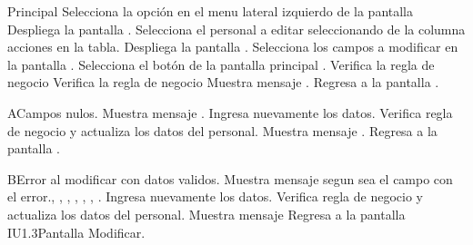 	\begin{UCtrayectoria}{Principal}
		\UCpaso[\UCactor]Selecciona la opción  en el menu lateral izquierdo de la pantalla 
		\UCpaso[\UCsist] Despliega la pantalla .	
		\UCpaso[\UCactor] Selecciona el personal a editar seleccionando   de la columna acciones en la tabla. 
		\UCpaso[\UCsist] Despliega la pantalla .
		\UCpaso[\UCactor] Selecciona los campos a modificar en la pantalla .
		\UCpaso[\UCactor] Selecciona el botón  de la pantalla principal .
		\UCpaso[\UCsist] Verifica la regla de negocio   
		\UCpaso[\UCsist] Verifica la regla de negocio  
		\UCpaso[\UCsist] Muestra mensaje .
		\UCpaso[\UCsist] Regresa a la pantalla .
	\end{UCtrayectoria}
		\begin{UCtrayectoriaA}{A}{Campos nulos.}
		\UCpaso[\UCsist] Muestra mensaje .
		\UCpaso[\UCactor] Ingresa nuevamente los datos.
		\UCpaso[\UCsist] Verifica regla de negocio  y actualiza los datos del personal. 
		\UCpaso[\UCsist] Muestra mensaje .
		\UCpaso[\UCsist] Regresa a la pantalla .
		\end{UCtrayectoriaA}

		\begin{UCtrayectoriaA}{B}{Error al modificar con datos validos.}
		\UCpaso[\UCsist] Muestra mensaje segun sea el campo con el error., , , , , , .
		\UCpaso[\UCactor] Ingresa nuevamente los datos.
		\UCpaso[\UCsist] Verifica regla de negocio  y actualiza los datos del personal.
		\UCpaso[\UCsist] Muestra mensaje 
		\UCpaso[\UCsist] Regresa a la pantalla {IU1.3}{Pantalla Modificar}.
	\end{UCtrayectoriaA}
		
		
		
